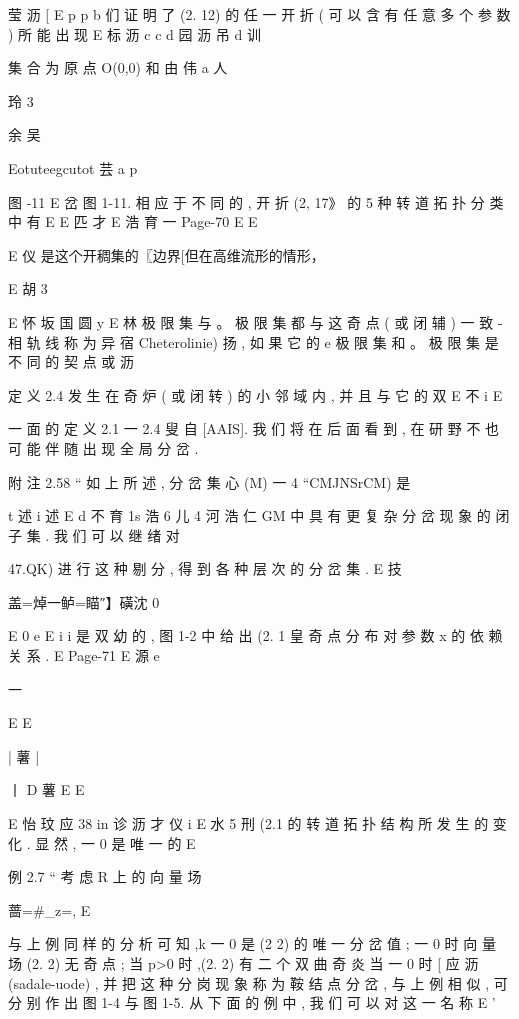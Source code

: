 {莹 沥 [
E p p b
们 证 明 了 (2. 12) 的 任 一 开 折 ( 可 以 含 有 任 意 多 个 参 数 ) 所 能 出 现
E 标 沥
c
c d
园 沥 吊 d 训

集 合 为 原 点 O(0,0) 和 由
伟 a 人

玲
3

余 吴

Eotuteegcutot 芸 a p

图 -11 E
岔 图 1-11. 相 应 于 不 同 的 , 开 折 (2, 17》 的 5 种 转 道 拓 扑 分 类 中 有
E
E 匹 才
E 浩 育 一
Page-70
E E

E 仪 是这个开稠集的〖边界[但在高维流形的情形，

E 胡 3

E 怀 坂 国 圆 y
E 林
极 限 集 与 。 极 限 集 都 与 这 奇 点 ( 或 闭 辅 ) 一 致 - 相 轨 线 称 为 异 宿
Cheterolinie) 扬 , 如 果 它 的 e 极 限 集 和 。 极 限 集 是 不 同 的 契 点 或
沥

定 义 2.4 发 生 在 奇 炉 ( 或 闭 转 ) 的 小 邻 域 内 , 并 且 与 它 的 双
E 不
i
E

一 面 的 定 义 2.1 一 2.4 叟 自 [AAIS]. 我 们 将 在 后 面 看 到 , 在 研
野 不
也 可 能 伴 随 出 现 全 局 分 岔 .

附 注 2.58 “ 如 上 所 述 , 分 岔 集 心 (M) 一 4 “CMJNSrCM) 是

t 述 i 述
E d 不 育 1s 浩 6 儿 4 河 浩
仁 GM 中 具 有 更 复 杂 分 岔 现 象 的 闭 子 集 . 我 们 可 以 继 绪 对

47.QK) 进 行 这 种 剔 分 , 得 到 各 种 层 次 的 分 岔 集 .
E 技

盖=焯一鲈=瞄″】磺沈 0

E
0
e
E i i
是 双 幼 的 , 图 1-2 中 给 出 (2. 1 皇 奇 点 分 布 对 参 数 x 的 依 赖 关 系 .
E
Page-71
E 源 e

一

E E

|
薯
|

丨 D
薯
E E

E 怡 玟 应 38 in 诊 沥 才 仪
i
E 水 5
刑 (2.1 的 转 道 拓 扑 结 构 所 发 生 的 变 化 . 显 然 , 一 0 是 唯 一 的
E

例 2.7 “ 考 虑 R 上 的 向 量 场

蔷=#_z=, E

与 上 例 同 样 的 分 析 可 知 ,k 一 0 是 (2 2) 的 唯 一 分 岔 值 ; 一 0 时 向
量 场 (2. 2) 无 奇 点 ; 当 p>0 时 ,(2. 2) 有 二 个 双 曲 奇 炎 当 一 0 时
[ 应 沥
(sadale-uode) , 并 把 这 种 分 岗 现 象 称 为 鞍 结 点 分 岔 , 与 上 例 相 似 ,
可 分 别 作 出 图 1-4 与 图 1-5. 从 下 面 的 例 中 , 我 们 可 以 对 这 一 名 称
E '

}
